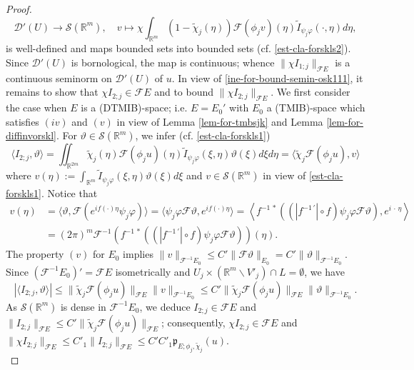 \documentclass[12pt,reqno]{amsart}
\newcommand{\RR}{\mathbb R}
\newcommand{\DD}{\mathcal D}
\newcommand{\SSS}{\mathcal S}
\theoremstyle{plain}
\theoremstyle{remark}
\theoremstyle{definition}
\numberwithin{equation}{section}
\begin{document}
\begin{proof}
\begin{equation*}
\DD'(U)\rightarrow\SSS(\RR^m),\quad v\mapsto \chi\int_{\RR^m}(1-\widetilde{\chi}_j(\eta))\mathcal{F}(\phi_j v)(\eta)\widetilde I_{\psi_j\varphi}(\cdot,\eta)d\eta,
\end{equation*}
is well-defined and maps bounded sets into bounded sets (cf. \eqref{est-cla-forskls2}). Since $\DD'(U)$ is bornological, the map is continuous; whence $\|\chi I_{1;j}\|_{\mathcal{F}E}$ is a continuous seminorm on $\DD'(U)$ of $u$. In view of \eqref{ine-for-bound-semin-osk111}, it remains to show that $\chi I_{2;j}\in\mathcal{F}E$ and to bound $\|\chi I_{2;j}\|_{\mathcal{F}E}$. We first consider the case when $E$ is a (DTMIB)-space; i.e. $E=E_0'$ with $E_0$ a (TMIB)-space which satisfies $(iv)$ and $(v)$ in view of Lemma \ref{lem-for-tmbsjk} and Lemma \ref{lem-for-diffinvorskl}. For $\vartheta\in \SSS(\RR^m)$, we infer (cf. \eqref{est-cla-forskls1})
\begin{equation*}
\langle I_{2;j},\vartheta\rangle=\iint_{\RR^{2m}}\widetilde{\chi}_j(\eta)\mathcal{F}(\phi_j u)(\eta)\widetilde{I}_{\psi_j\varphi}(\xi,\eta)\vartheta(\xi)d\xi d\eta=\langle \widetilde{\chi}_j\mathcal{F}(\phi_j u),v\rangle
\end{equation*}
where $v(\eta):=\int_{\RR^m}\widetilde{I}_{\psi_j\varphi}(\xi,\eta)\vartheta(\xi)d\xi$ and $v\in\SSS(\RR^m)$ in view of \eqref{est-cla-forskls1}. Notice that
\begin{align*}
v(\eta)&=\langle \vartheta,\mathcal{F}(e^{if(\cdot)\eta}\psi_j\varphi)\rangle =\langle\psi_j\varphi\mathcal{F}\vartheta,e^{if(\cdot)\eta}\rangle=\left\langle f^{-1\,*}\left((|f^{-1\,'}|\circ f)\psi_j\varphi\mathcal{F}\vartheta\right),e^{i\,\cdot\,\eta}\right\rangle\\
&= (2\pi)^m\mathcal{F}^{-1}\left(f^{-1\,*}\left((|f^{-1\, '}|\circ f)\psi_j\varphi\mathcal{F}\vartheta\right)\right)(\eta).
\end{align*}
The property $(v)$ for $E_0$ implies $\|v\|_{\mathcal{F}^{-1}E_0}\leq C'\|\mathcal{F}\vartheta\|_{E_0}=C'\|\vartheta\|_{\mathcal{F}^{-1}E_0}$. Since $(\mathcal{F}^{-1}E_0)'=\mathcal{F}E$ isometrically and $U_j\times(\RR^m\backslash V'_j)\cap L=\emptyset$, we have
\begin{equation*}
|\langle I_{2;j},\vartheta\rangle|\leq \|\widetilde{\chi}_j\mathcal{F}(\phi_j u)\|_{\mathcal{F}E}\|v\|_{\mathcal{F}^{-1}E_0}\leq C'\|\widetilde{\chi}_j\mathcal{F}(\phi_j u)\|_{\mathcal{F}E}\|\vartheta\|_{\mathcal{F}^{-1}E_0}.
\end{equation*}
As $\SSS(\RR^m)$ is dense in $\mathcal{F}^{-1}E_0$, we deduce $I_{2;j}\in \mathcal{F}E$ and $\|I_{2;j}\|_{\mathcal{F}E}\leq C'\|\widetilde{\chi}_j\mathcal{F}(\phi_j u)\|_{\mathcal{F}E}$; consequently, $\chi I_{2;j}\in\mathcal{F}E$ and $\|\chi I_{2;j}\|_{\mathcal{F}E}\leq C'_1\|I_{2;j}\|_{\mathcal{F}E}\leq C'C'_1\mathfrak{p}_{E;\phi_j,\widetilde{\chi}_j}(u)$.\\

\end{proof}
\end{document}
